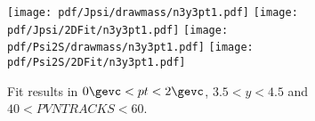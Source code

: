 \begin{figure}[H]
\begin{center}
\texttt{[image: pdf/Jpsi/drawmass/n3y3pt1.pdf]}
\texttt{[image: pdf/Jpsi/2DFit/n3y3pt1.pdf]}
\vspace*{-0.5cm}
\texttt{[image: pdf/Psi2S/drawmass/n3y3pt1.pdf]}
\texttt{[image: pdf/Psi2S/2DFit/n3y3pt1.pdf]}
\vspace*{-0.5cm}
\end{center}
\caption{Fit results in $0\gevc<pt<2\gevc$, $3.5<y<4.5$ and $40<PVNTRACKS<60$.}
\label{Fitn3y3pt1}
\end{figure}
